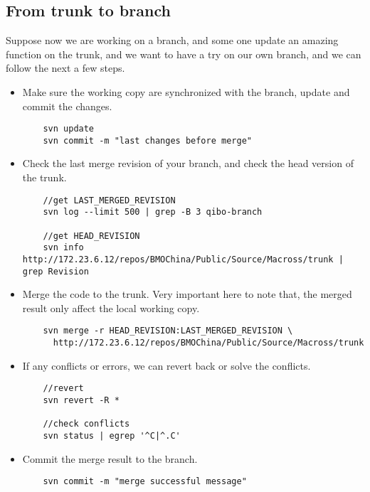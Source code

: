 \documentclass{article}
\begin{document}
\subsection{From trunk to branch}
Suppose now we are working on a branch, and some one update an amazing function on the trunk, and we want to have a try on our own branch, and we can follow the next a few steps.

\begin{itemize}
\item
	Make sure the working copy are synchronized with the branch, update and commit the changes.
	\begin{lstlisting}
	svn update 
	svn commit -m "last changes before merge"
	\end{lstlisting}

\item
	Check the last merge revision of your branch, and check the head version of the trunk.
	\begin{lstlisting}
	//get LAST_MERGED_REVISION
	svn log --limit 500 | grep -B 3 qibo-branch
	
	//get HEAD_REVISION 											  
	svn info http://172.23.6.12/repos/BMOChina/Public/Source/Macross/trunk | grep Revision  
	\end{lstlisting}

\item
	Merge the code to the trunk. Very important here to note that, the merged result only affect the local working copy.
	\begin{lstlisting}
	svn merge -r HEAD_REVISION:LAST_MERGED_REVISION \
	  http://172.23.6.12/repos/BMOChina/Public/Source/Macross/trunk
	\end{lstlisting}

\item
	If any conflicts or errors, we can revert back or solve the conflicts.
	\begin{lstlisting}
	//revert	
	svn revert -R *
	
	//check conflicts
	svn status | egrep '^C|^.C'
	\end{lstlisting}

\item
	Commit the merge result to the branch.
	\begin{lstlisting}
	svn commit -m "merge successful message"
	\end{lstlisting}
\end{itemize}

\end{document}
